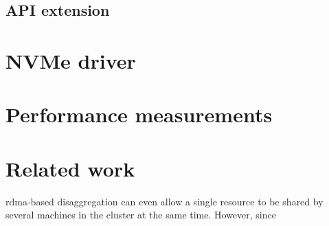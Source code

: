 \subsection{API extension}

\section{NVMe driver}\label{sec:nvme}


\section{Performance measurements}\label{sec:eval}

\section{Related work}\label{sec:rw}
\Gls{rdma}-based \gls{disaggregation} can even allow a single resource to be shared by several machines in the cluster at the same time. 
%
However, since 
